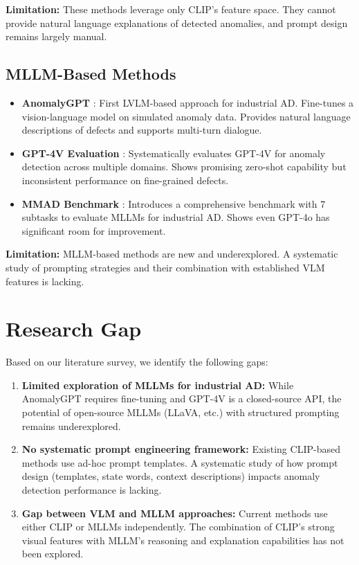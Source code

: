 \documentclass[12pt, a4paper]{article}
\begin{document}
\textbf{Limitation:} These methods leverage only CLIP's feature space. They cannot provide natural language explanations of detected anomalies, and prompt design remains largely manual.

\subsection{MLLM-Based Methods}

\begin{itemize}[leftmargin=*]
    \item \textbf{AnomalyGPT} \cite{gu2024anomalygpt}: First LVLM-based approach for industrial AD. Fine-tunes a vision-language model on simulated anomaly data. Provides natural language descriptions of defects and supports multi-turn dialogue.
    
    \item \textbf{GPT-4V Evaluation} \cite{cao2023gpt4v}: Systematically evaluates GPT-4V for anomaly detection across multiple domains. Shows promising zero-shot capability but inconsistent performance on fine-grained defects.
    
    \item \textbf{MMAD Benchmark} \cite{jiang2025mmad}: Introduces a comprehensive benchmark with 7 subtasks to evaluate MLLMs for industrial AD. Shows even GPT-4o has significant room for improvement.
\end{itemize}

\textbf{Limitation:} MLLM-based methods are new and underexplored. A systematic study of prompting strategies and their combination with established VLM features is lacking.

\section{Research Gap}

Based on our literature survey, we identify the following gaps:

\begin{enumerate}[leftmargin=*]
    \item \textbf{Limited exploration of MLLMs for industrial AD:} While AnomalyGPT requires fine-tuning and GPT-4V is a closed-source API, the potential of open-source MLLMs (LLaVA, etc.) with structured prompting remains underexplored.
    
    \item \textbf{No systematic prompt engineering framework:} Existing CLIP-based methods use ad-hoc prompt templates. A systematic study of how prompt design (templates, state words, context descriptions) impacts anomaly detection performance is lacking.
    
    \item \textbf{Gap between VLM and MLLM approaches:} Current methods use either CLIP or MLLMs independently. The combination of CLIP's strong visual features with MLLM's reasoning and explanation capabilities has not been explored.
\end{enumerate}
\end{document}
